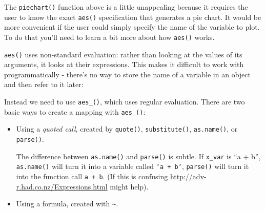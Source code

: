 The \texttt{piechart()} function above is a little unappealing because
it requires the user to know the exact \texttt{aes()} specification that
generates a pie chart. It would be more convenient if the user could
simply specify the name of the variable to plot. To do that you'll need
to learn a bit more about how \texttt{aes()} works.

\texttt{aes()} uses non-standard evaluation: rather than looking at the
values of its arguments, it looks at their expressions. This makes it
difficult to work with programmatically - there's no way to store the
name of a variable in an object and then refer to it later:

\begin{Shaded}
\begin{Highlighting}[]
\end{Highlighting}
\end{Shaded}

Instead we need to use \texttt{aes\_()}, which uses regular evaluation.
There are two basic ways to create a mapping with \texttt{aes\_()}:

\begin{itemize}
\item
  Using a \emph{quoted call}, created by \texttt{quote()},
  \texttt{substitute()}, \texttt{as.name()}, or \texttt{parse()}.
     

\begin{Shaded}
\begin{Highlighting}[]
\NormalTok{(}
\NormalTok{(}
\NormalTok{(}\NormalTok{(} \NormalTok{x_var)[[}\NormalTok{]])}

\StringTok{ }
  \NormalTok{(}
\NormalTok{\}}
\end{Highlighting}
\end{Shaded}

  The difference between \texttt{as.name()} and \texttt{parse()} is
  subtle. If \texttt{x\_var} is ``a + b'', \texttt{as.name()} will turn
  it into a variable called \texttt{`a\ +\ b`}, \texttt{parse()} will
  turn it into the function call \texttt{a\ +\ b}. (If this is confusing
  \url{http://adv-r.had.co.nz/Expressions.html} might help).
\item
  Using a formula, created with \texttt{\textasciitilde{}}.
  \indexc{\textasciitilde}

\begin{Shaded}
\begin{Highlighting}[]
\end{Highlighting}
\end{Shaded}
\end{itemize}


